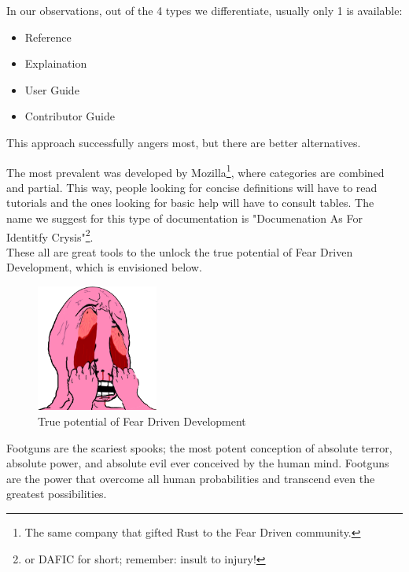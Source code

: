 \documentclass{book}
\begin{document}
    In our observations,
    out of the 4 types we differentiate,
    usually only 1 is available:
    \begin{itemize}
        \itemsep-0.5em 
        \item Reference
        \item Explaination
        \item User Guide
        \item Contributor Guide
    \end{itemize}
    This approach successfully angers most,
    but there are better alternatives.

    The most prevalent was developed by Mozilla\footnote{
        The same company that gifted Rust to the Fear Driven community.
    },
    where categories are combined and partial.
    This way,
    people looking for concise definitions will have to read tutorials
    and the ones looking for basic help will have to consult tables.
    The name we suggest for this type of documentation is
    "Documenation As For Identitfy Crysis"\footnote{
        or DAFIC for short; remember: insult to injury!
    }.
    \\

    These all are great tools to the unlock the true potential of Fear Driven Development,
    which is envisioned below.
    \\

    \begin{figure}[h!]
        \centering
        \includegraphics[width=40mm]{angry-pink-wojak.png}
        \caption{True potential of Fear Driven Development}
        \label{fig:method}
    \end{figure}


    Footguns are the scariest spooks;
    the most potent conception of absolute terror,
    absolute power,
    and absolute evil ever conceived by the human mind.
    Footguns are the power that overcome all human probabilities
    and transcend even the greatest possibilities.
    \\
\end{document}
